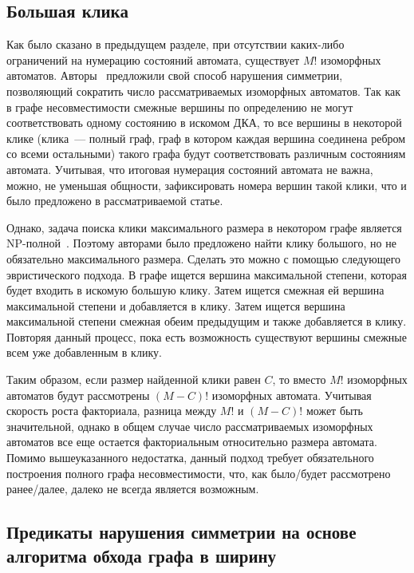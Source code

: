 
\subsection{Большая клика}
\label{sec:review:sym-breaking:large-clique}

Как было сказано в предыдущем разделе, при отсутствии каких-либо ограничений на нумерацию состояний автомата, существует $M!$ изоморфных автоматов.
Авторы~\cite{heule-icgi10} предложили свой способ нарушения симметрии, позволяющий сократить число рассматриваемых изоморфных автоматов.
Так как в графе несовместимости смежные вершины по определению не могут соответствовать одному состоянию в искомом ДКА, то все вершины в некоторой клике (клика~{---} полный граф, граф в котором каждая вершина соединена ребром со всеми остальными)  такого графа будут соответствовать различным состояниям автомата.
Учитывая, что итоговая нумерация состояний автомата не важна, можно, не уменьшая общности, зафиксировать номера вершин такой клики, что и было предложено в рассматриваемой статье.

Однако, задача поиска клики максимального размера в некотором графе является NP-полной~\cite{DBLP:conf/coco/Karp72}.
Поэтому авторами было предложено найти клику большого, но не обязательно максимального размера.
Сделать это можно с помощью следующего эвристического подхода.
В графе ищется вершина максимальной степени, которая будет входить в искомую большую клику.
Затем ищется смежная ей вершина максимальной степени и добавляется в клику.
Затем ищется вершина максимальной степени смежная обеим предыдущим и также добавляется в клику. 
Повторяя данный процесс, пока есть возможность существуют вершины смежные всем уже добавленным в клику.

Таким образом, если размер найденной клики равен $C$, то вместо $M!$ изоморфных автоматов будут рассмотрены $(M - C)!$ изоморфных автомата.
Учитывая скорость роста факториала, разница между $M!$ и $(M - C)!$ может быть значительной, однако в общем случае число рассматриваемых изоморфных автоматов все еще остается факториальным относительно размера автомата.
Помимо вышеуказанного недостатка, данный подход требует обязательного построения полного графа несовместимости, что, как было/будет  рассмотрено ранее/далее, далеко не всегда является возможным.

\subsection{Предикаты нарушения симметрии на основе алгоритма обхода графа в ширину}
\label{sec:review:sym-breaking:bfs-based}


